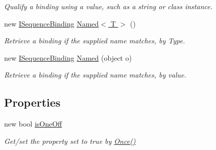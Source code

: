 \begin{DoxyCompactItemize}
\begin{DoxyCompactList}\small\item\em Qualify a binding using a value, such as a string or class instance. \end{DoxyCompactList}\item 
\hypertarget{interfacestrange_1_1extensions_1_1sequencer_1_1api_1_1_i_sequence_binding_a3a6df6195fa27bcf3ccb33f56eca1579}{new \hyperlink{interfacestrange_1_1extensions_1_1sequencer_1_1api_1_1_i_sequence_binding}{I\-Sequence\-Binding} \hyperlink{interfacestrange_1_1extensions_1_1sequencer_1_1api_1_1_i_sequence_binding_a3a6df6195fa27bcf3ccb33f56eca1579}{Named$<$ T $>$} ()}\label{interfacestrange_1_1extensions_1_1sequencer_1_1api_1_1_i_sequence_binding_a3a6df6195fa27bcf3ccb33f56eca1579}

\begin{DoxyCompactList}\small\item\em Retrieve a binding if the supplied name matches, by Type. \end{DoxyCompactList}\item 
\hypertarget{interfacestrange_1_1extensions_1_1sequencer_1_1api_1_1_i_sequence_binding_ab1b19550316cae92a6988b1c9151dc2d}{new \hyperlink{interfacestrange_1_1extensions_1_1sequencer_1_1api_1_1_i_sequence_binding}{I\-Sequence\-Binding} \hyperlink{interfacestrange_1_1extensions_1_1sequencer_1_1api_1_1_i_sequence_binding_ab1b19550316cae92a6988b1c9151dc2d}{Named} (object o)}\label{interfacestrange_1_1extensions_1_1sequencer_1_1api_1_1_i_sequence_binding_ab1b19550316cae92a6988b1c9151dc2d}

\begin{DoxyCompactList}\small\item\em Retrieve a binding if the supplied name matches, by value. \end{DoxyCompactList}\end{DoxyCompactItemize}
\subsection*{Properties}
\begin{DoxyCompactItemize}
\item 
\hypertarget{interfacestrange_1_1extensions_1_1sequencer_1_1api_1_1_i_sequence_binding_abeefd12e2d120e42079dd066491bd61b}{new bool \hyperlink{interfacestrange_1_1extensions_1_1sequencer_1_1api_1_1_i_sequence_binding_abeefd12e2d120e42079dd066491bd61b}{is\-One\-Off}}\label{interfacestrange_1_1extensions_1_1sequencer_1_1api_1_1_i_sequence_binding_abeefd12e2d120e42079dd066491bd61b}

\begin{DoxyCompactList}\small\item\em Get/set the property set to {\ttfamily true} by {\ttfamily \hyperlink{interfacestrange_1_1extensions_1_1sequencer_1_1api_1_1_i_sequence_binding_a2ee9928660f3e2973c970aa8c802b648}{Once()}} \end{DoxyCompactList}\end{DoxyCompactItemize}


